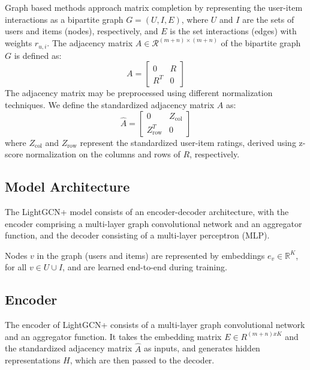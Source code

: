\documentclass[10pt,conference,compsocconf]{IEEEtran}
\begin{document}
Graph based methods approach matrix completion by representing the user-item interactions as a bipartite graph $G = (U, I, E)$, where $U$ and $I$ are the sets of users and items (nodes), respectively, and $E$ is the set interactions (edges) with weights $r_{u,i}$.
The adjacency matrix $A \in \mathcal{R}^{(m+n) \times (m+n)}$ of the bipartite graph $G$ is defined as:
\begin{equation}
    A = \begin{bmatrix}
    0 & R \\
    R^T & 0
    \end{bmatrix}
\end{equation}
The adjacency matrix may be preprocessed using different normalization techniques.
We define the standardized adjacency matrix \(\hat{A}\) as:
\begin{equation}
    \hat{A} = \begin{bmatrix}
    0 & Z_{\text{col}} \\
    Z_{\text{row}}^T & 0
    \end{bmatrix}
    \label{eq:A_hat}
\end{equation}
where \(Z_{\text{col}}\) and \(Z_{\text{row}}\) represent the standardized user-item ratings, derived using z-score normalization on the columns and rows of \(R\), respectively. 

\subsection{Model Architecture}
The LightGCN+ model consists of an encoder-decoder architecture, with the encoder comprising a multi-layer graph convolutional network and an aggregator function, and the decoder consisting of a multi-layer perceptron (MLP).

Nodes $v$ in the graph (users and items) are represented by embeddings $e_v \in \mathbb{R}^K$, for all $v \in U \cup I$, and are learned end-to-end during training.

\subsection{Encoder}
The encoder of LightGCN+ consists of a multi-layer graph convolutional network and an aggregator function.
It takes the embedding matrix $E \in R^{(m+n)xK}$ and the standardized adjacency matrix \(\hat{A}\) as inputs, and generates hidden representations $H$, which are then passed to the decoder.
\end{document}
